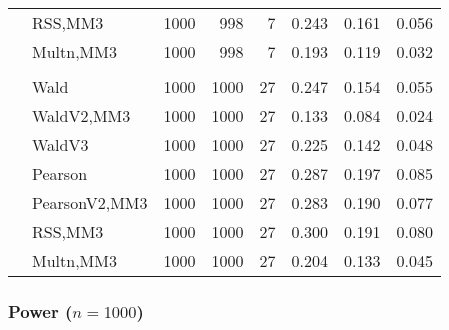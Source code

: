 \documentclass[
]{article}
\begin{document}
\begin{table}[H]
{\begin{tabular}[t]{llrrrrrr}
\hspace{1em} & RSS,MM3 & 1000 & 998 & 7 & 0.243 & 0.161 & 0.056\\

\hspace{1em} & Multn,MM3 & 1000 & 998 & 7 & 0.193 & 0.119 & 0.032\\
\cmidrule{1-8}
\addlinespace[0.3em]
\multicolumn{8}{l}{\textbf{3F 15V}}\\
\hspace{1em} & Wald & 1000 & 1000 & 27 & 0.247 & 0.154 & 0.055\\

\hspace{1em} & WaldV2,MM3 & 1000 & 1000 & 27 & 0.133 & 0.084 & 0.024\\

\hspace{1em} & WaldV3 & 1000 & 1000 & 27 & 0.225 & 0.142 & 0.048\\

\hspace{1em} & Pearson & 1000 & 1000 & 27 & 0.287 & 0.197 & 0.085\\

\hspace{1em} & PearsonV2,MM3 & 1000 & 1000 & 27 & 0.283 & 0.190 & 0.077\\

\hspace{1em} & RSS,MM3 & 1000 & 1000 & 27 & 0.300 & 0.191 & 0.080\\

\hspace{1em} & Multn,MM3 & 1000 & 1000 & 27 & 0.204 & 0.133 & 0.045\\
\bottomrule
\end{tabular}}
\end{table}

\hypertarget{power-n1000}{%
\subsubsection{\texorpdfstring{Power
(\(n=1000\))}{Power (n=1000)}}\label{power-n1000}}
\end{document}
